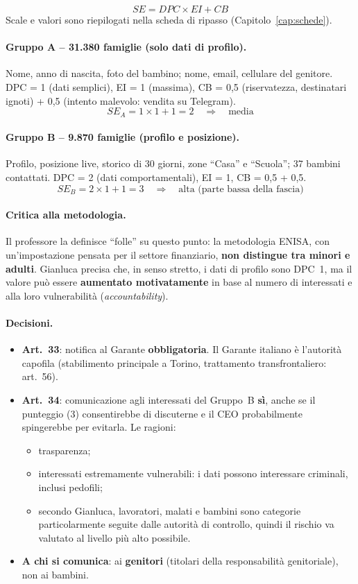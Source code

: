 \[
SE = DPC \times EI + CB
\]
Scale e valori sono riepilogati nella scheda di ripasso (Capitolo~\ref{cap:schede}).

\paragraph{Gruppo A -- 31.380 famiglie (solo dati di profilo).}
Nome, anno di nascita, foto del bambino; nome, email, cellulare del genitore.
DPC = 1 (dati semplici), EI = 1 (massima), CB = 0,5 (riservatezza, destinatari ignoti) + 0,5
(intento malevolo: vendita su Telegram).
\[
SE_A = 1 \times 1 + 1 = 2 \quad\Rightarrow\quad \text{media}
\]

\paragraph{Gruppo B -- 9.870 famiglie (profilo e posizione).}
Profilo, posizione live, storico di 30 giorni, zone ``Casa'' e ``Scuola''; 37 bambini contattati.
DPC = 2 (dati comportamentali), EI = 1, CB = 0,5 + 0,5.
\[
SE_B = 2 \times 1 + 1 = 3 \quad\Rightarrow\quad \text{alta (parte bassa della fascia)}
\]

\paragraph{Critica alla metodologia.} Il professore la definisce ``folle'' su questo punto: la
metodologia ENISA, con un'impostazione pensata per il settore finanziario, \textbf{non distingue tra
minori e adulti}. Gianluca precisa che, in senso stretto, i dati di profilo sono DPC~1, ma il valore
può essere \textbf{aumentato motivatamente} in base al numero di interessati e alla loro
vulnerabilità (\emph{accountability}).

\paragraph{Decisioni.}
\begin{itemize}
  \item \textbf{Art.~33}: notifica al Garante \textbf{obbligatoria}. Il Garante italiano è l'autorità
    capofila (stabilimento principale a Torino, trattamento transfrontaliero: art.~56).
  \item \textbf{Art.~34}: comunicazione agli interessati del Gruppo~B \textbf{sì}, anche se il punteggio
    (3) consentirebbe di discuterne e il CEO probabilmente spingerebbe per evitarla. Le ragioni:
    \begin{itemize}
      \item trasparenza;
      \item interessati estremamente vulnerabili: i dati possono interessare criminali, inclusi pedofili;
      \item secondo Gianluca, lavoratori, malati e bambini sono categorie particolarmente seguite
        dalle autorità di controllo, quindi il rischio va valutato al livello più alto possibile.
    \end{itemize}
  \item \textbf{A chi si comunica}: ai \textbf{genitori} (titolari della responsabilità genitoriale),
    non ai bambini.
\end{itemize}

